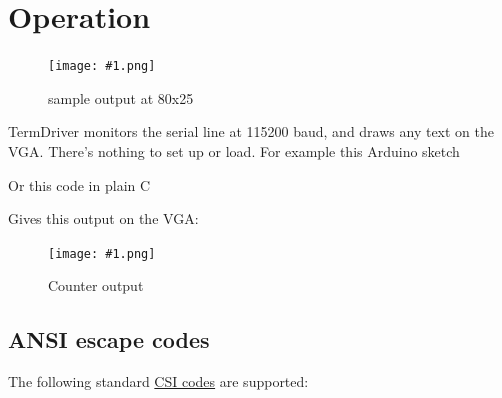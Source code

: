 \documentclass{article}
\newcommand{\png}[2]{
\begin{figure}[H]
\begin{center}
\texttt{[image: \#1.png]}
\caption{#2}
\end{center}
\end{figure}
}
\begin{document}
\newcommand{\eg}[1]{
\begin{framed}

\end{framed}
}

\eg{termdriver-helloworld}

\section{Operation}

\png{img/page1}{sample output at 80x25}

TermDriver monitors the serial line at 115200 baud, and draws any
text on the VGA.
There's nothing to set up or load.
For example this Arduino sketch

\eg{termdriver-counter1}

\noindent
Or this code in plain C

\eg{termdriver-counter2}

\noindent
Gives this output on the VGA:

\png{img/page2}{Counter output}

\subsection{ANSI escape codes}

The following standard
\href{https://en.wikipedia.org/wiki/ANSI_escape_code\#CSI_sequences}{CSI
codes} are supported:
\end{document}
